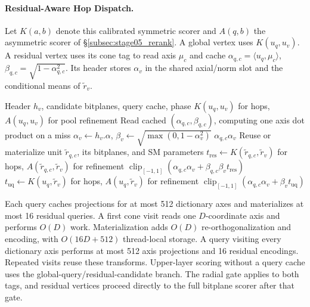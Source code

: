 \paragraph{Residual-Aware Hop Dispatch.}
Let $K(a,b)$ denote this calibrated symmetric scorer and $A(q,b)$ the asymmetric scorer of \S\ref{subsec:stage05_rerank}. A global vertex uses $K(u_q,u_v)$. A residual vertex uses its cone tag to read axis $\mu_c$ and cache $\alpha_{q,c}=\langle u_q,\mu_c\rangle$, $\beta_{q,c}=\sqrt{1-\alpha_{q,c}^2}$. Its header stores $\alpha_v$ in the shared axial/norm slot and the conditional means of $\tilde r_v$.
\begin{algorithm}[t]
 \caption{Residual-aware candidate cosine scoring}
 \label{alg:residual_score}
 \begin{algorithmic}[1]
 \Require Header $h_v$, candidate bitplanes, query cache, phase
  \State \Return $K(u_q,u_v)$ for hops, $A(u_q,u_v)$ for pool refinement
 \EndIf
 \State Read cached $(\alpha_{q,c},\beta_{q,c})$, computing one axis dot product on a miss
 \State $\alpha_v\gets h_v.\alpha$, $\beta_v\gets\sqrt{\max(0,1-\alpha_v^2)}$
  \State \Return $\alpha_{q,c}\alpha_v$
 \EndIf
  \State Reuse or materialize unit $\tilde r_{q,c}$, its bitplanes, and SM parameters
  \State $t_{\mathrm{res}}\gets K(\tilde r_{q,c},\tilde r_v)$ for hops, $A(\tilde r_{q,c},\tilde r_v)$ for refinement
  \State \Return $\operatorname{clip}_{[-1,1]}(\alpha_{q,c}\alpha_v+\beta_{q,c}\beta_v t_{\mathrm{res}})$
 \Else
  \State $t_{\mathrm{uq}}\gets K(u_q,\tilde r_v)$ for hops, $A(u_q,\tilde r_v)$ for refinement 
  \State \Return $\operatorname{clip}_{[-1,1]}(\alpha_{q,c}\alpha_v+\beta_v t_{\mathrm{uq}})$
 \EndIf
 \end{algorithmic}
\end{algorithm}
Each query caches projections for at most 512 dictionary axes and materializes at most 16 residual queries. A first cone visit reads one $D$-coordinate axis and performs $O(D)$ work. Materialization adds $O(D)$ re-orthogonalization and encoding, with $O(16D+512)$ thread-local storage. A query visiting every dictionary axis performs at most 512 axis projections and 16 residual encodings. Repeated visits reuse these transforms. Upper-layer scoring without a query cache uses the global-query/residual-candidate branch. The radial gate applies to both tags, and residual vertices proceed directly to the full bitplane scorer after that gate.

